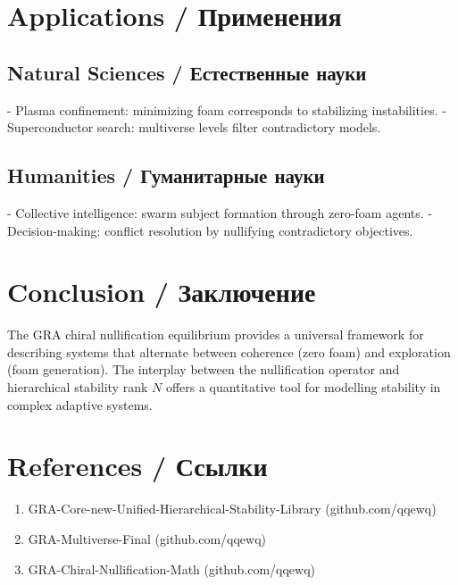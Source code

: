 \documentclass[12pt,a4paper]{article}
\begin{document}
\section{Applications / Применения}
\subsection{Natural Sciences / Естественные науки}
- Plasma confinement: minimizing foam corresponds to stabilizing instabilities.
- Superconductor search: multiverse levels filter contradictory models.

\subsection{Humanities / Гуманитарные науки}
- Collective intelligence: swarm subject formation through zero-foam agents.
- Decision-making: conflict resolution by nullifying contradictory objectives.

\section{Conclusion / Заключение}
The GRA chiral nullification equilibrium provides a universal framework for describing systems that alternate between coherence (zero foam) and exploration (foam generation). The interplay between the nullification operator and hierarchical stability rank $N$ offers a quantitative tool for modelling stability in complex adaptive systems.

\section*{References / Ссылки}
\begin{enumerate}
\item GRA-Core-new-Unified-Hierarchical-Stability-Library (github.com/qqewq)
\item GRA-Multiverse-Final (github.com/qqewq)
\item GRA-Chiral-Nullification-Math (github.com/qqewq)
\end{enumerate}
\end{document}
